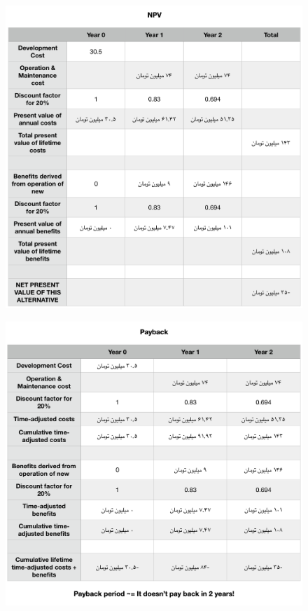 \documentclass{article}
\begin{document}
\begin{center}
\begin{figure}[htp]
\includegraphics[width = 1\textwidth]{NPV2.png}
\caption{}
\label{npv2}
\end{figure}

\begin{figure}[htp]
\includegraphics[width = 1\textwidth]{PB2.png}
\caption{}
\label{pb2}
\end{figure}

\end{center}
\end{document}
